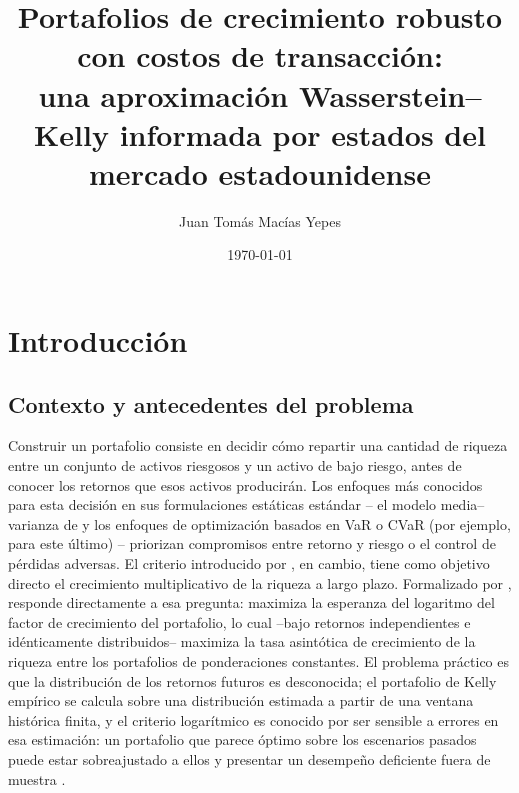 \documentclass[11pt]{article}
\title{Portafolios de crecimiento robusto con costos de transacción:\\
una aproximación Wasserstein--Kelly informada por estados del mercado estadounidense}
\author{Juan Tomás Macías Yepes}
\date{\today}
\begin{document}
\maketitle{}

\section{Introducción}

\subsection{Contexto y antecedentes del problema}

Construir un portafolio consiste en decidir cómo repartir una cantidad de riqueza entre un
conjunto de activos riesgosos y un activo de bajo riesgo, antes de conocer los retornos que
esos activos producirán. Los enfoques más conocidos para esta decisión en sus formulaciones estáticas estándar -- el modelo media–varianza de \citet{markowitz1952} y los enfoques de optimización basados en VaR o CVaR  (por ejemplo,  \citet{rockafellaruryasev2000} para este último) -- priorizan compromisos entre retorno y riesgo o el control de pérdidas adversas. El criterio introducido por \citet{kelly1956}, en cambio, tiene como objetivo directo el crecimiento multiplicativo de la riqueza a largo plazo.
Formalizado por \citet{breiman1961}, responde
directamente a esa pregunta: maximiza la esperanza del logaritmo del factor de crecimiento
del portafolio, lo cual --bajo retornos independientes e idénticamente distribuidos-- maximiza
la tasa asintótica de crecimiento de la riqueza entre los portafolios de ponderaciones
constantes. El problema práctico es que la distribución de los retornos futuros es
desconocida; el portafolio de Kelly empírico se calcula sobre una distribución estimada a
partir de una ventana histórica finita, y el criterio logarítmico es conocido por ser sensible a
errores en esa estimación: un portafolio que parece óptimo sobre los escenarios pasados
puede estar sobreajustado a ellos y presentar un desempeño deficiente fuera de muestra \citep{li2023}.
\end{document}
